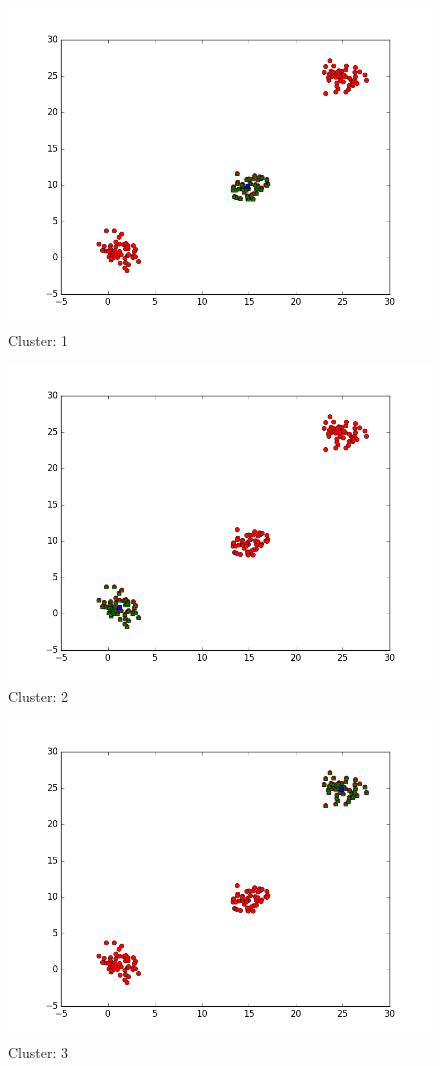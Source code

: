 \documentclass{article}
\begin{document}
\begin{figure}[h]
    \centering
    \includegraphics[width=\textwidth]{KMeans0.png}
    \caption{Cluster: 1}
    \label{fig:roc}
\end{figure}
\begin{figure}[h]
    \centering
    \includegraphics[width=\textwidth]{KMeans1.png}
    \caption{Cluster: 2}
    \label{fig:roc}
\end{figure}
\begin{figure}[h]
    \centering
    \includegraphics[width=\textwidth]{KMeans2.png}
    \caption{Cluster: 3}
    \label{fig:roc}
\end{figure}
\end{document}

